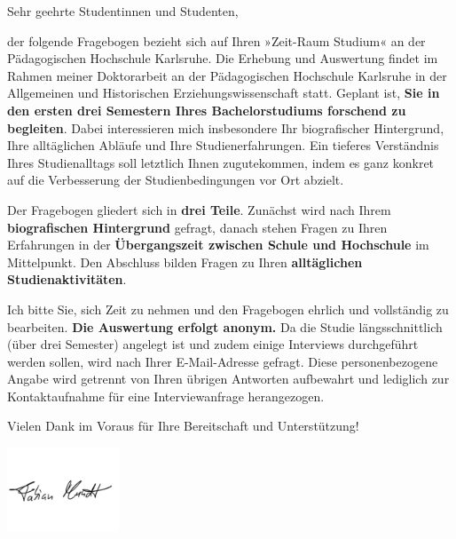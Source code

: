 

\begin{info}
\vspace{.5cm}

Sehr geehrte Studentinnen und Studenten,

\vspace{.5em}

der folgende Fragebogen bezieht sich auf Ihren »Zeit-Raum Studium« an der Pädagogischen Hochschule Karlsruhe. Die Erhebung und Auswertung findet im Rahmen meiner Doktorarbeit an der Pädagogischen Hochschule Karlsruhe in der Allgemeinen und Historischen Erziehungswissenschaft statt. Geplant ist, \textbf{Sie in den ersten drei Semestern Ihres Bachelorstudiums forschend zu begleiten}. Dabei interessieren mich insbesondere Ihr biografischer Hintergrund, Ihre alltäglichen Abläufe und Ihre Studienerfahrungen. Ein tieferes Verständnis Ihres Studienalltags soll letztlich Ihnen zugutekommen, indem es ganz konkret auf die Verbesserung der Studienbedingungen vor Ort abzielt.

\vspace{.5em}

Der Fragebogen gliedert sich in \textbf{drei Teile}. Zunächst wird nach Ihrem \textbf{biografischen Hintergrund} gefragt, danach stehen Fragen zu Ihren Erfahrungen in der \textbf{Übergangszeit zwischen Schule und Hochschule} im Mittelpunkt. Den Abschluss bilden Fragen zu Ihren \textbf{alltäglichen Studienaktivitäten}.

\vspace{.5em}

Ich bitte Sie, sich Zeit zu nehmen und den Fragebogen ehrlich und vollständig zu bearbeiten. \textbf{Die Auswertung erfolgt anonym.} Da die Studie längsschnittlich (über drei Semester) angelegt ist und zudem einige Interviews durchgeführt werden sollen, wird nach Ihrer E-Mail-Adresse gefragt. Diese personenbezogene Angabe wird getrennt von Ihren übrigen Antworten aufbewahrt und  lediglich zur Kontaktaufnahme für eine Interviewanfrage herangezogen.

\vspace{.5em}

Vielen Dank im Voraus für Ihre Bereitschaft und Unterstützung!

\vspace{-1cm}

\includegraphics[width=0.25\textwidth]{unterschrift.png}

\vspace{-1.5cm}
\end{info}


